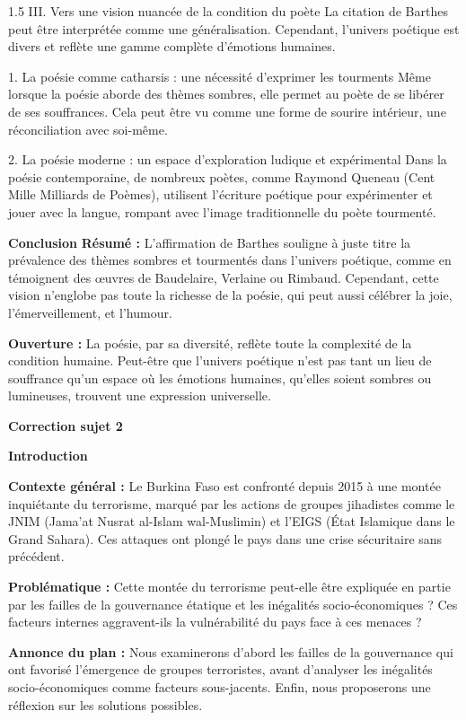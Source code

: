 \documentclass[12pt]{article}
\begin{document}
\begin{spacing}{1.5}
\quad
III. Vers une vision nuancée de la condition du poète
La citation de Barthes peut être interprétée comme une généralisation. Cependant, l'univers poétique est divers et reflète une gamme complète d'émotions humaines.

1. La poésie comme catharsis : une nécessité d'exprimer les tourments
Même lorsque la poésie aborde des thèmes sombres, elle permet au poète de se libérer de ses souffrances. Cela peut être vu comme une forme de sourire intérieur, une réconciliation avec soi-même.

2. La poésie moderne : un espace d'exploration ludique et expérimental
Dans la poésie contemporaine, de nombreux poètes, comme Raymond Queneau (Cent Mille Milliards de Poèmes), utilisent l'écriture poétique pour expérimenter et jouer avec la langue, rompant avec l'image traditionnelle du poète tourmenté.

\quad
\quad
\textbf{ Conclusion}
\textbf{Résumé : }L'affirmation de Barthes souligne à juste titre la prévalence des thèmes sombres et tourmentés dans l'univers poétique, comme en témoignent des œuvres de Baudelaire, Verlaine ou Rimbaud. Cependant, cette vision n'englobe pas toute la richesse de la poésie, qui peut aussi célébrer la joie, l'émerveillement, et l'humour.

\textbf{Ouverture :} La poésie, par sa diversité, reflète toute la complexité de la condition humaine. Peut-être que l'univers poétique n'est pas tant un lieu de souffrance qu'un espace où les émotions humaines, qu'elles soient sombres ou lumineuses, trouvent une expression universelle.




\quad

\textbf{Correction sujet 2}

\textbf{Introduction}

\textbf{Contexte général :} Le Burkina Faso est confronté depuis 2015 à une montée inquiétante du terrorisme, marqué par les actions de groupes jihadistes comme le JNIM (Jama’at Nusrat al-Islam wal-Muslimin) et l’EIGS (État Islamique dans le Grand Sahara). Ces attaques ont plongé le pays dans une crise sécuritaire sans précédent.

\textbf{Problématique :} Cette montée du terrorisme peut-elle être expliquée en partie par les failles de la gouvernance étatique et les inégalités socio-économiques ? Ces facteurs internes aggravent-ils la vulnérabilité du pays face à ces menaces ?

\textbf{Annonce du plan :} Nous examinerons d'abord les failles de la gouvernance qui ont favorisé l'émergence de groupes terroristes, avant d'analyser les inégalités socio-économiques comme facteurs sous-jacents. Enfin, nous proposerons une réflexion sur les solutions possibles.


\end{spacing}
\end{document}
